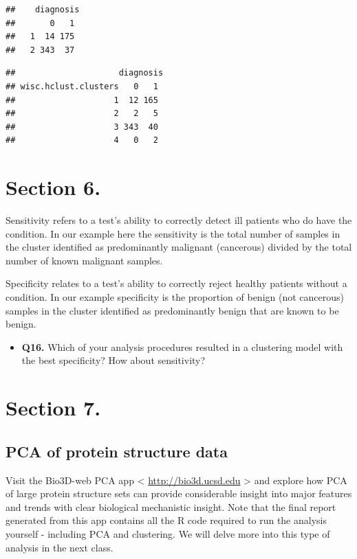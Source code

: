 \documentclass[]{article}
\providecommand{\tightlist}{%
  \setlength{\itemsep}{0pt}\setlength{\parskip}{0pt}}
\begin{document}
\begin{verbatim}
##    diagnosis
##       0   1
##   1  14 175
##   2 343  37
\end{verbatim}

\begin{verbatim}
##                     diagnosis
## wisc.hclust.clusters   0   1
##                    1  12 165
##                    2   2   5
##                    3 343  40
##                    4   0   2
\end{verbatim}

\section{Section 6.}\label{section-6.}

Sensitivity refers to a test's ability to correctly detect ill patients
who do have the condition. In our example here the sensitivity is the
total number of samples in the cluster identified as predominantly
malignant (cancerous) divided by the total number of known malignant
samples.

Specificity relates to a test's ability to correctly reject healthy
patients without a condition. In our example specificity is the
proportion of benign (not cancerous) samples in the cluster identified
as predominantly benign that are known to be benign.

\begin{itemize}
\tightlist
\item
  \textbf{Q16.} Which of your analysis procedures resulted in a
  clustering model with the best specificity? How about sensitivity?
\end{itemize}

\section{Section 7.}\label{section-7.}

\subsection{PCA of protein structure
data}\label{pca-of-protein-structure-data}

Visit the Bio3D-web PCA app \textless{} \url{http://bio3d.ucsd.edu}
\textgreater{} and explore how PCA of large protein structure sets can
provide considerable insight into major features and trends with clear
biological mechanistic insight. Note that the final report generated
from this app contains all the R code required to run the analysis
yourself - including PCA and clustering. We will delve more into this
type of analysis in the next class.
\end{document}
